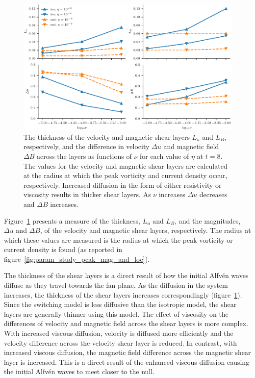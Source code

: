 \begin{figure}[t]
  \centering
  \includegraphics[width=1.0\linewidth]{param_study/layer_thickness_and_shear.pdf}
  \caption{The thickness of the velocity and magnetic shear layers $L_u$ and $L_B$, respectively, and the difference in velocity $\Delta u$ and magnetic field $\Delta B$ across the layers as functions of $\nu$ for each value of $\eta$ at $t=8$. The values for the velocity and magnetic shear layers are calculated at the radius at which the peak vorticity and current density occur, respectively. Increased diffusion in the form of either resistivity or viscosity results in thicker shear layers. As $\nu$ increases $\Delta u$ decreases and $\Delta B$ increases.}%
  \label{fig:layer_thickness_and_shear}
\end{figure}

Figure~\ref{fig:layer_thickness_and_shear} presents a measure of the thickness, $L_u$ and $L_B$, and the magnitudes, $\Delta u$ and $\Delta B$, of the velocity and magnetic shear layers, respectively. The radius at which these values are measured is the radius at which the peak vorticity or current density is found (as reported in figure~\ref{fig:param_study_peak_mag_and_loc}). 

The thickness of the shear layers is a direct result of how the initial Alfv\'en waves diffuse as they travel towards the fan plane. As the diffusion in the system increases, the thickness of the shear layers increases correspondingly (figure~\ref{fig:layer_thickness_and_shear}). Since the switching model is less diffusive than the isotropic model, the shear layers are generally thinner using this model. The effect of viscosity on the differences of velocity and magnetic field across the shear layers is more complex. With increased viscous diffusion, velocity is diffused more efficiently and the velocity difference across the velocity shear layer is reduced. In contrast, with increased viscous diffusion, the magnetic field difference across the magnetic shear layer is increased. This is a direct result of the enhanced viscous diffusion causing the initial Alfv\'en waves to meet closer to the null.

